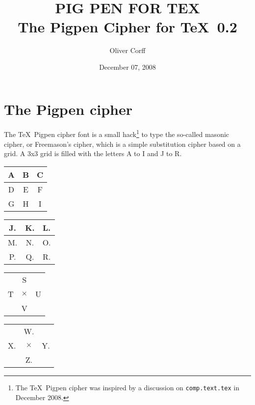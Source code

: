 \documentclass[a4paper]{article}
\title{{\pigpenfont PIG PEN FOR TEX}\\[0.5cm]
	The Pigpen Cipher for \TeX\ 0.2}
\author{Oliver Corff}
\date{December 07, 2008}
\begin{document}
\maketitle


\section{The Pigpen cipher}

The \TeX\ Pigpen cipher font is a small hack\footnote{%
	The \TeX\ Pigpen cipher was inspired by a discussion on
	\texttt{comp.text.tex} in December 2008.} 
to type the so-called masonic cipher, or Freemason's cipher,
which is a simple substitution cipher based on a grid. 
A 3x3 grid is filled with the letters A to I and J to R.
\begin{center}
\begin{minipage}[t]{3cm}%
\begin{tabular}{c|c|c}
	A&B&C\\
	\hline
	D&E&F\\
	\hline
	G&H&I\\
\end{tabular}\end{minipage}%
\begin{minipage}[t]{3cm}%
\begin{tabular}{c|c|c}
	J.&K.&L.\\
	\hline
	M.&N.&O.\\
	\hline
	P.&Q.&R.\\
\end{tabular}\end{minipage}
\begin{minipage}[t]{3cm}%
\begin{tabular}{ccc}
	 &S& \\
	T&$\times$&U\\
	 &V& \\
\end{tabular}\end{minipage}%
\begin{minipage}[t]{3cm}%
\begin{tabular}{ccc}
	 &W.& \\
	X.&$\times$&Y.\\
	 &Z.&\\
\end{tabular}\end{minipage}
\end{center}
\end{document}
